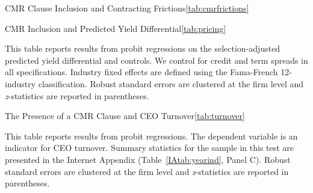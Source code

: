 \documentclass[a4paper,12pt]{article}
\begin{document}
\begin{singlespace}
\begin{papertable}{CMR Clause Inclusion and Contracting Frictions}{\ref{tab:cmrfrictions}}{}
\end{papertable}



\begin{papertable}{CMR Inclusion and Predicted Yield Differential}{\ref{tab:pricing}}{} \label{tab:pricing}

    This table reports results from probit regressions on the selection-adjusted predicted yield differential and controls.
    We control for credit and term spreads in all specifications.
    Industry fixed effects are defined using the Fama-French 12-industry classification.
    Robust standard errors are clustered at the firm level and \textit{z}-statistics are reported in parentheses.
    \postamble

    \startdata
    
\end{papertable}



\begin{papertable}{The Presence of a CMR Clause and CEO Turnover}{\ref{tab:turnover}}{} \label{tab:turnover}

    This table reports results from probit regressions.
    The dependent variable is an indicator for CEO turnover.
    Summary statistics for the sample in this test are presented in the Internet Appendix (Table~\ref{IAtab:yearind}, Panel C).
    Robust standard errors are clustered at the firm level and \textit{z}-statistics are reported in parentheses.
    \postamble


\end{papertable}
\end{singlespace}
\end{document}
